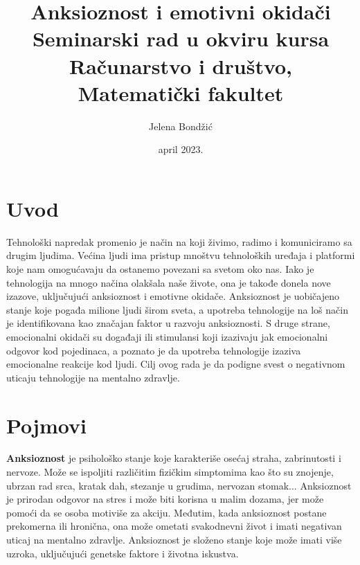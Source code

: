 \documentclass[a4paper]{article}
\begin{document}
	
	\title{Anksioznost i emotivni okidači\\ \small{Seminarski rad u okviru kursa\\Računarstvo i društvo,\\ Matematički fakultet}}
	
	\author{Jelena Bondžić}
	\date{april 2023.}
	\maketitle
	
	
		 		
		\tableofcontents
		
		\newpage
		
		\section{Uvod}
		\label{sec:uvod}
				 Tehnološki napredak promenio je način na koji živimo, radimo i komuniciramo sa drugim ljudima. Većina ljudi ima pristup mnoštvu tehnoloških uređaja i platformi koje nam omogućavaju da ostanemo povezani sa svetom oko nas. Iako je tehnologija na mnogo načina olakšala naše živote, ona je takođe donela nove izazove, uključujući anksioznost i emotivne okidače. Anksioznost je uobičajeno stanje koje pogađa milione ljudi širom sveta, a  upotreba tehnologije na loš način je identifikovana kao značajan faktor u razvoju anksioznosti. \cite{prva} S druge strane, emocionalni okidači su događaji ili stimulansi koji izazivaju jak emocionalni odgovor kod pojedinaca, a poznato je da upotreba tehnologije izaziva emocionalne reakcije kod ljudi. Cilj ovog rada je da podigne svest o negativnom uticaju tehnologije na mentalno zdravlje.
		
		
            \section{Pojmovi}
		\label{sec:podnaslov1}
                \textbf{Anksioznost} je psihološko stanje koje karakteriše osećaj straha, zabrinutosti i nervoze. Može se ispoljiti različitim fizičkim simptomima kao što su znojenje, ubrzan rad srca, kratak dah, stezanje u grudima, nervozan stomak... Anksioznost je prirodan odgovor na stres i može biti korisna u malim dozama, jer može pomoći da se osoba motiviše za akciju. Međutim, kada anksioznost postane prekomerna ili hronična, ona može ometati svakodnevni život i imati negativan uticaj na mentalno zdravlje. Anksioznost je složeno stanje koje može imati više uzroka, uključujući genetske faktore i životna iskustva. 
    
\end{document}
